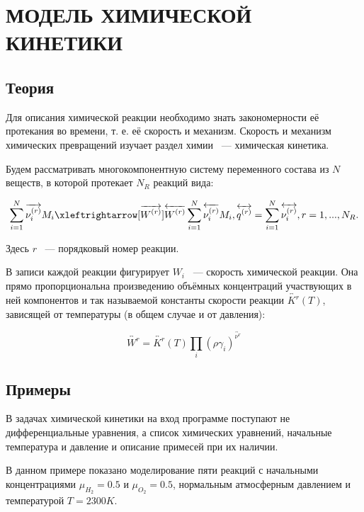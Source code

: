 \section{МОДЕЛЬ ХИМИЧЕСКОЙ КИНЕТИКИ}

\subsection{Теория}

Для описания химической реакции необходимо знать закономерности её протекания во времени, т. е. её скорость и механизм. Скорость и
механизм химических превращений изучает раздел химии ~--- химическая кинетика.

Будем рассматривать многокомпонентную систему переменного состава из $N$ веществ, в которой протекает $N_R$ реакций вида:

$$
\sum\limits_{i = 1}^{N}\overrightarrow{\nu_i^{(r)}}M_i \xleftrightarrow[\overrightarrow{W^{(r)}}]{\overleftarrow{W^{(r)}}} \sum\limits_{i = 1}^{N}\overleftarrow{\nu_i^{(r)}}M_i,\\
\overleftrightarrow{q^{(r)}} = \sum\limits_{i = 1}^{N}\overleftrightarrow{\nu_i^{(r)}},\\
r = 1, ..., N_R.\\
$$

Здесь $r$ ~--- порядковый номер реакции.

В записи каждой реакции фигурирует $W_i$ ~--- скорость химической реакции. Она прямо пропорциональна произведению объёмных концентраций
участвующих в ней компонентов и так называемой константы скорости реакции $\overleftrightarrow{K^{r}}(T)$, зависящей от температуры
(в общем случае и от давления):

\begin{equation}
    \overleftrightarrow{W^{r}} = \overleftrightarrow{K^{r}}(T)\prod\limits_i(\rho\gamma_i)^{\overleftrightarrow{\nu^{r}}}
\end{equation}

\subsection{Примеры}

В задачах химической кинетики на вход программе поступают не дифференциальные уравнения, а список химических уравнений, начальные
температура и давление и описание примесей при их наличии.

В данном примере показано моделирование пяти реакций с начальными концентрациями $\mu_{H_2} = 0.5$ и $\mu_{O_2} = 0.5$, нормальным
атмосферным давлением и температурой $T = 2300K$.

